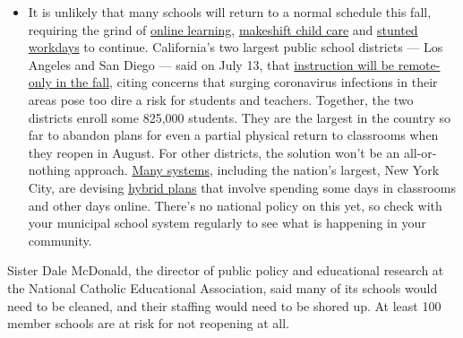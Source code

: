 \begin{itemize}
  \begin{itemize}
  \tightlist
  \item
    It is unlikely that many schools will return to a normal schedule
    this fall, requiring the grind of
    \href{https://www.nytimes3xbfgragh.onion/2020/06/05/us/coronavirus-education-lost-learning.html?action=click\&pgtype=Article\&state=default\&region=MAIN_CONTENT_3\&context=storylines_faq}{online
    learning},
    \href{https://www.nytimes3xbfgragh.onion/2020/05/29/us/coronavirus-child-care-centers.html?action=click\&pgtype=Article\&state=default\&region=MAIN_CONTENT_3\&context=storylines_faq}{makeshift
    child care} and
    \href{https://www.nytimes3xbfgragh.onion/2020/06/03/business/economy/coronavirus-working-women.html?action=click\&pgtype=Article\&state=default\&region=MAIN_CONTENT_3\&context=storylines_faq}{stunted
    workdays} to continue. California's two largest public school
    districts --- Los Angeles and San Diego --- said on July 13, that
    \href{https://www.nytimes3xbfgragh.onion/2020/07/13/us/lausd-san-diego-school-reopening.html?action=click\&pgtype=Article\&state=default\&region=MAIN_CONTENT_3\&context=storylines_faq}{instruction
    will be remote-only in the fall}, citing concerns that surging
    coronavirus infections in their areas pose too dire a risk for
    students and teachers. Together, the two districts enroll some
    825,000 students. They are the largest in the country so far to
    abandon plans for even a partial physical return to classrooms when
    they reopen in August. For other districts, the solution won't be an
    all-or-nothing approach.
    \href{https://bioethics.jhu.edu/research-and-outreach/projects/eschool-initiative/school-policy-tracker/}{Many
    systems}, including the nation's largest, New York City, are
    devising
    \href{https://www.nytimes3xbfgragh.onion/2020/06/26/us/coronavirus-schools-reopen-fall.html?action=click\&pgtype=Article\&state=default\&region=MAIN_CONTENT_3\&context=storylines_faq}{hybrid
    plans} that involve spending some days in classrooms and other days
    online. There's no national policy on this yet, so check with your
    municipal school system regularly to see what is happening in your
    community.
  \end{itemize}
\end{itemize}

Sister Dale McDonald, the director of public policy and educational
research at the National Catholic Educational Association, said many of
its schools would need to be cleaned, and their staffing would need to
be shored up. At least 100 member schools are at risk for not reopening
at all.

